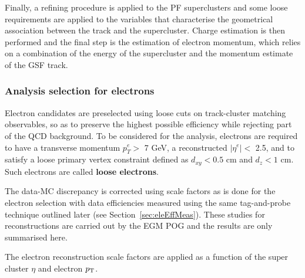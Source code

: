 Finally, a refining procedure is applied to the PF superclusters
and some loose requirements are applied to the variables that characterise the geometrical association between the track and the supercluster.
Charge estimation is then performed and the final step is the estimation of electron momentum,
which relies on a combination of the energy of the supercluster and the momentum estimate of the GSF track.

\subsubsection{Analysis selection for electrons}

Electron candidates are preselected using loose cuts on track-cluster matching observables, so as to preserve the highest possible efficiency while rejecting part of the QCD background. To be considered for the analysis, electrons are required to have a
transverse momentum $p^e_T >$ 7 GeV, a reconstructed $|\eta^e| <$ 2.5, and to satisfy a loose primary vertex 
constraint defined as $d_{xy} < 0.5$ cm and $d_z < 1$ cm.
Such electrons are called {\bf loose electrons}.

The data-MC discrepancy is corrected using scale factors as is done for the electron selection with data efficiencies measured using the same tag-and-probe technique outlined later (see Section~\ref{sec:eleEffMeas}). 
These studies for reconstructions are carried out by the EGM POG and the results are only summarised here.

The electron reconstruction scale factors 
are applied as a function of the super cluster $\eta$ and electron $p_{\mathrm{T}}$.


